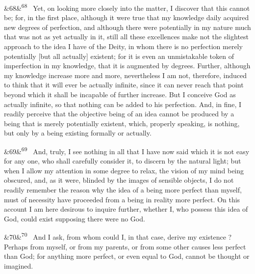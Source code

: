 \documentclass[12pt]{article}
\newcommand{\para}[1][]{\par\noindent\ifx&#1&\else\textsuperscript{\footnotesize #1}~\fi}
\begin{document}
\para[68] Yet, on looking more closely into the matter, I discover that this cannot be; for, in the first place, although it were true that my knowledge daily acquired new degrees of perfection, and although there were potentially in my nature much that was not as yet actually in it, still all these excellences make not the slightest approach to the idea I have of the Deity, in whom there is no perfection merely potentially [but all actually] existent; for it is even an unmistakable token of imperfection in my knowledge, that it is augmented by degrees. Further, although my knowledge increase more and more, nevertheless I am not, therefore, induced to think that it will ever be actually infinite, since it can never reach that point beyond which it shall be incapable of further increase. But I conceive God as actually infinite, so that nothing can be added to his perfection. And, in fine, I readily perceive that the objective being of an idea cannot be produced by a being that is merely potentially existent, which, properly speaking, is nothing, but only by a being existing formally or actually.

\para[69] And, truly, I see nothing in all that I have now said which it is not easy for any one, who shall carefully consider it, to discern by the natural light; but when I allow my attention in some degree to relax, the vision of my mind being obscured, and, as it were, blinded by the images of sensible objects, I do not readily remember the reason why the idea of a being more perfect than myself, must of necessity have proceeded from a being in reality more perfect. On this account I am here desirous to inquire further, whether I, who possess this idea of God, could exist supposing there were no God.

\para[70] And I ask, from whom could I, in that case, derive my existence ? Perhaps from myself, or from my parents, or from some other causes less perfect than God; for anything more perfect, or even equal to God, cannot be thought or imagined.
\end{document}
